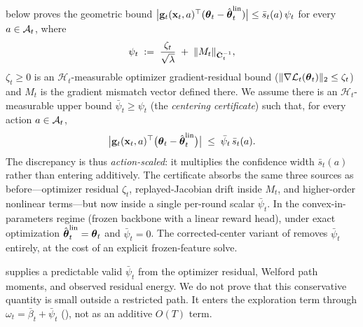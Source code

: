 \documentclass[twoside]{article}
\newcommand{\cHist}{\mathcal{H}}                %
\begin{document}
\begin{assumption}\label{asm:optim}
 below proves the geometric bound
$\bigl|\mathbf{g}_t(\mathbf{x}_t,a)^\top(\boldsymbol{\theta}_t-\hat{\boldsymbol{\theta}}_t^{\mathrm{lin}})\bigr|
\le\bar s_t(a)\,\psi_t$ for every $a\in\mathcal{A}_t$, where
\begin{equation}\label{eq:psi-def}
  \psi_t \;:=\; \frac{\zeta_t}{\sqrt{\lambda}}
  \;+\; \|M_t\|_{\bar{\mathbf{C}}_t^{-1}},
\end{equation}
$\zeta_t\ge0$ is an $\cHist_t$-measurable optimizer gradient-residual bound
($\|\nabla\mathcal{L}_t(\boldsymbol{\theta}_t)\|_2\le\zeta_t$) and $M_t$ is the gradient
mismatch vector defined there.
We assume there is an $\cHist_t$-measurable upper bound
$\bar\psi_t\ge\psi_t$ (the \emph{centering certificate}) such that,
for every action $a\in\mathcal{A}_t$,
\begin{equation}\label{eq:pred-stab}
  \bigl|\mathbf{g}_t(\mathbf{x}_t,a)^\top
    \bigl(\boldsymbol{\theta}_t - \hat{\boldsymbol{\theta}}_t^{\mathrm{lin}}\bigr)\bigr|
  \;\le\;
  \bar\psi_t\,\bar s_t(a).
\end{equation}
The discrepancy is thus \emph{action-scaled}: it multiplies the
confidence width $\bar s_t(a)$ rather than entering additively.  The
certificate absorbs the same three sources as before---optimizer residual
$\zeta_t$, replayed-Jacobian drift inside $M_t$, and higher-order nonlinear
terms---but now inside a single per-round scalar $\bar\psi_t$.
In the convex-in-parameters regime (frozen backbone with a linear reward
head), under exact optimization $\hat{\boldsymbol{\theta}}_t^{\mathrm{lin}}=\boldsymbol{\theta}_t$ and
$\bar\psi_t=0$.
The corrected-center variant of  removes
$\bar\psi_t$ entirely, at the cost of an explicit frozen-feature solve.
\end{assumption}

\begin{remark}
 supplies a predictable valid $\bar\psi_t$ from
the optimizer residual, Welford path moments, and observed residual energy.
We do not prove that this conservative quantity is small outside a restricted
path.  It enters the exploration term
through $\omega_t=\bar\beta_t+\bar\psi_t$
(), not as an additive $O(T)$ term.
\end{remark}
\end{document}
